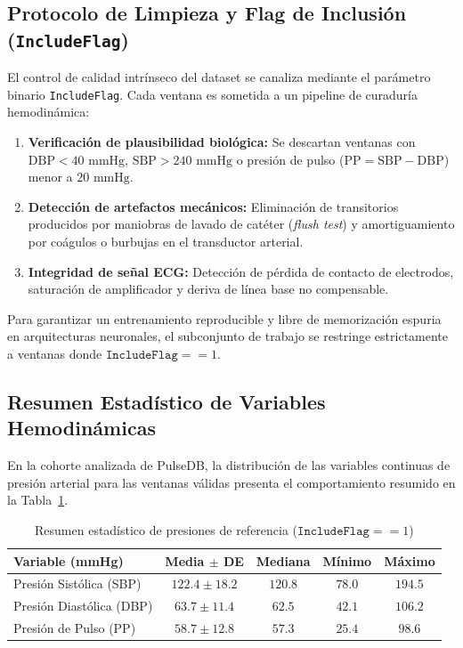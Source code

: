\documentclass[journal,10pt]{IEEEtran}
\begin{document}
\subsection{Protocolo de Limpieza y Flag de Inclusión (\texttt{IncludeFlag})}
El control de calidad intrínseco del dataset se canaliza mediante el parámetro binario \texttt{IncludeFlag}. Cada ventana es sometida a un pipeline de curaduría hemodinámica:
\begin{enumerate}
    \item \textbf{Verificación de plausibilidad biológica:} Se descartan ventanas con $\text{DBP} < 40\text{ mmHg}$, $\text{SBP} > 240\text{ mmHg}$ o presión de pulso ($\text{PP} = \text{SBP} - \text{DBP}$) menor a $20\text{ mmHg}$.
    \item \textbf{Detección de artefactos mecánicos:} Eliminación de transitorios producidos por maniobras de lavado de catéter (\textit{flush test}) y amortiguamiento por coágulos o burbujas en el transductor arterial.
    \item \textbf{Integridad de señal ECG:} Detección de pérdida de contacto de electrodos, saturación de amplificador y deriva de línea base no compensable.
\end{enumerate}

Para garantizar un entrenamiento reproducible y libre de memorización espuria en arquitecturas neuronales, el subconjunto de trabajo se restringe estrictamente a ventanas donde $\texttt{IncludeFlag} == 1$.

\subsection{Resumen Estadístico de Variables Hemodinámicas}
En la cohorte analizada de PulseDB, la distribución de las variables continuas de presión arterial para las ventanas válidas presenta el comportamiento resumido en la Tabla~\ref{tab:resumen_estadistico}.

\begin{table}[htbp]
\caption{Resumen estadístico de presiones de referencia ($\texttt{IncludeFlag} == 1$)}
\label{tab:resumen_estadistico}
\centering
\begin{tabular}{lcccc}
\toprule
\textbf{Variable (mmHg)} & \textbf{Media $\pm$ DE} & \textbf{Mediana} & \textbf{Mínimo} & \textbf{Máximo} \\
\midrule
Presión Sistólica (SBP) & $122.4 \pm 18.2$ & $120.8$ & $78.0$ & $194.5$ \\
Presión Diastólica (DBP) & $63.7 \pm 11.4$  & $62.5$  & $42.1$ & $106.2$ \\
Presión de Pulso (PP)   & $58.7 \pm 12.8$  & $57.3$  & $25.4$ & $98.6$  \\
\bottomrule
\end{tabular}
\end{table}
\end{document}
